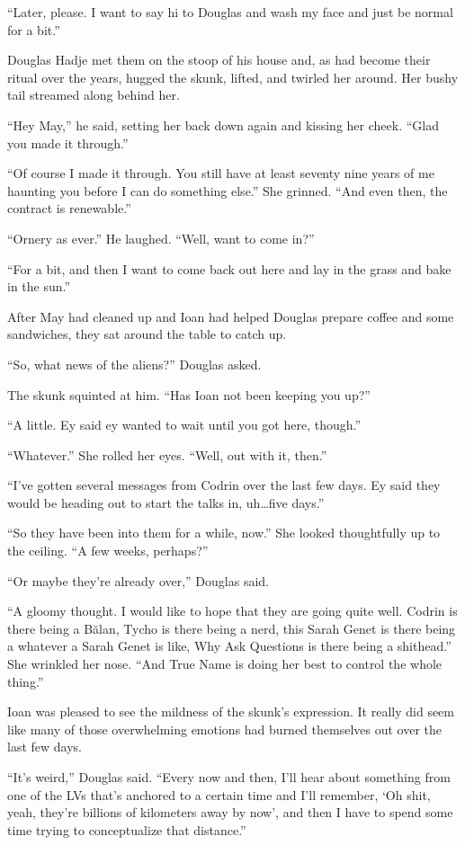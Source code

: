 ``Later, please. I want to say hi to Douglas and wash my face and just be normal for a bit.''

Douglas Hadje met them on the stoop of his house and, as had become their ritual over the years, hugged the skunk, lifted, and twirled her around. Her bushy tail streamed along behind her.

``Hey May,'' he said, setting her back down again and kissing her cheek. ``Glad you made it through.''

``Of course I made it through. You still have at least seventy nine years of me haunting you before I can do something else.'' She grinned. ``And even then, the contract is renewable.''

``Ornery as ever.'' He laughed. ``Well, want to come in?''

``For a bit, and then I want to come back out here and lay in the grass and bake in the sun.''

After May had cleaned up and Ioan had helped Douglas prepare coffee and some sandwiches, they sat around the table to catch up.

``So, what news of the aliens?'' Douglas asked.

The skunk squinted at him. ``Has Ioan not been keeping you up?''

``A little. Ey said ey wanted to wait until you got here, though.''

``Whatever.'' She rolled her eyes. ``Well, out with it, then.''

``I've gotten several messages from Codrin over the last few days. Ey said they would be heading out to start the talks in, uh\ldots five days.''

``So they have been into them for a while, now.'' She looked thoughtfully up to the ceiling. ``A few weeks, perhaps?''

``Or maybe they're already over,'' Douglas said.

``A gloomy thought. I would like to hope that they are going quite well. Codrin is there being a Bălan, Tycho is there being a nerd, this Sarah Genet is there being a whatever a Sarah Genet is like, Why Ask Questions is there being a shithead.'' She wrinkled her nose. ``And True Name is doing her best to control the whole thing.''

Ioan was pleased to see the mildness of the skunk's expression. It really did seem like many of those overwhelming emotions had burned themselves out over the last few days.

``It's weird,'' Douglas said. ``Every now and then, I'll hear about something from one of the LVs that's anchored to a certain time and I'll remember, `Oh shit, yeah, they're billions of kilometers away by now', and then I have to spend some time trying to conceptualize that distance.''

